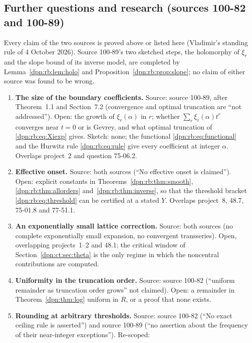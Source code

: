 \documentclass[11pt]{article}
\numberwithin{equation}{section}
\theoremstyle{definition}\newtheorem{definition}[theorem]{Definition}
\theoremstyle{remark}\newtheorem{remark}[theorem]{Remark}
\begin{document}
\subsection{Further questions and research (sources 100-82 and 100-89)}\label{dpn:rb:sec:questions}
Every claim of the two sources is proved above or listed here (Vladimir's
standing rule of 4 October 2026).  Source 100-89's two sketched steps, the
holomorphy of $\xi_r$ and the slope bound of its inverse model, are completed
by Lemma~\ref{dpn:rb:lem:holo} and Proposition~\ref{dpn:rb:prop:slope}; no
claim of either source was found to be wrong.
\begin{enumerate}[label=\textbf{100.\arabic*}, leftmargin=*]
\item \textbf{The size of the boundary coefficients.}  Source: source 100-89,
  after Theorem~1.1 and Section~7.2 (convergence and optimal truncation are
  ``not addressed'').  Open: the growth of $\xi_r(\alpha)$ in $r$; whether
  $\sum_r\xi_r(\alpha)t^r$ converges near $t=0$ or is Gevrey, and what
  optimal truncation of \eqref{dpn:rb:eq:Xiexp} gives.  Sketch: none; the
  functional \eqref{dpn:rb:eq:functional} and the Hurwitz rule
  \eqref{dpn:rb:eq:rule} give every coefficient at integer $\alpha$.  Overlaps
  project~2 and question 75-06.2.
\item \textbf{Effective onset.}  Source: both sources (``No effective onset
  is claimed'').  Open: explicit constants in
  Theorems~\ref{dpn:rb:thm:smooth}, \ref{dpn:rb:thm:allorders}
  and~\ref{dpn:rb:thm:inverse}, so that the threshold bracket
  \eqref{dpn:rb:eq:threshold} can be certified at a stated $Y$.  Overlaps
  project~8, 48.7, 75-01.8 and 77-51.1.
\item \textbf{An exponentially small lattice correction.}  Source: both
  sources (no complete exponentially small expansion, no convergent
  transseries).  Open, overlapping projects~1--2 and 48.1; the critical
  window of Section~\ref{dpn:ct:sec:theta} is the only regime in which the
  noncentral contributions are computed.
\item \textbf{Uniformity in the truncation order.}  Source: source 100-82
  (``uniform remainder as truncation order grows'' not claimed).  Open: a
  remainder in Theorem~\ref{dpn:thm:log} uniform in $R$, or a proof that none
  exists.
\item \textbf{Rounding at arbitrary thresholds.}  Source: source 100-82 (``No
  exact ceiling rule is asserted'') and source 100-89 (``no assertion about
  the frequency of their near-integer exceptions'').  Re-scoped:

\end{enumerate}
\end{document}
